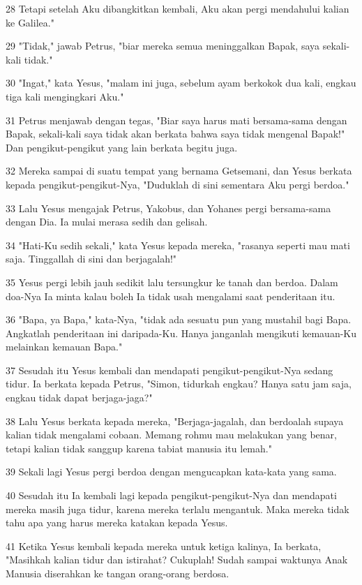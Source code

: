 \par 28 Tetapi setelah Aku dibangkitkan kembali, Aku akan pergi mendahului kalian ke Galilea."
\par 29 "Tidak," jawab Petrus, "biar mereka semua meninggalkan Bapak, saya sekali-kali tidak."
\par 30 "Ingat," kata Yesus, "malam ini juga, sebelum ayam berkokok dua kali, engkau tiga kali mengingkari Aku."
\par 31 Petrus menjawab dengan tegas, "Biar saya harus mati bersama-sama dengan Bapak, sekali-kali saya tidak akan berkata bahwa saya tidak mengenal Bapak!" Dan pengikut-pengikut yang lain berkata begitu juga.
\par 32 Mereka sampai di suatu tempat yang bernama Getsemani, dan Yesus berkata kepada pengikut-pengikut-Nya, "Duduklah di sini sementara Aku pergi berdoa."
\par 33 Lalu Yesus mengajak Petrus, Yakobus, dan Yohanes pergi bersama-sama dengan Dia. Ia mulai merasa sedih dan gelisah.
\par 34 "Hati-Ku sedih sekali," kata Yesus kepada mereka, "rasanya seperti mau mati saja. Tinggallah di sini dan berjagalah!"
\par 35 Yesus pergi lebih jauh sedikit lalu tersungkur ke tanah dan berdoa. Dalam doa-Nya Ia minta kalau boleh Ia tidak usah mengalami saat penderitaan itu.
\par 36 "Bapa, ya Bapa," kata-Nya, "tidak ada sesuatu pun yang mustahil bagi Bapa. Angkatlah penderitaan ini daripada-Ku. Hanya janganlah mengikuti kemauan-Ku melainkan kemauan Bapa."
\par 37 Sesudah itu Yesus kembali dan mendapati pengikut-pengikut-Nya sedang tidur. Ia berkata kepada Petrus, "Simon, tidurkah engkau? Hanya satu jam saja, engkau tidak dapat berjaga-jaga?"
\par 38 Lalu Yesus berkata kepada mereka, "Berjaga-jagalah, dan berdoalah supaya kalian tidak mengalami cobaan. Memang rohmu mau melakukan yang benar, tetapi kalian tidak sanggup karena tabiat manusia itu lemah."
\par 39 Sekali lagi Yesus pergi berdoa dengan mengucapkan kata-kata yang sama.
\par 40 Sesudah itu Ia kembali lagi kepada pengikut-pengikut-Nya dan mendapati mereka masih juga tidur, karena mereka terlalu mengantuk. Maka mereka tidak tahu apa yang harus mereka katakan kepada Yesus.
\par 41 Ketika Yesus kembali kepada mereka untuk ketiga kalinya, Ia berkata, "Masihkah kalian tidur dan istirahat? Cukuplah! Sudah sampai waktunya Anak Manusia diserahkan ke tangan orang-orang berdosa.
